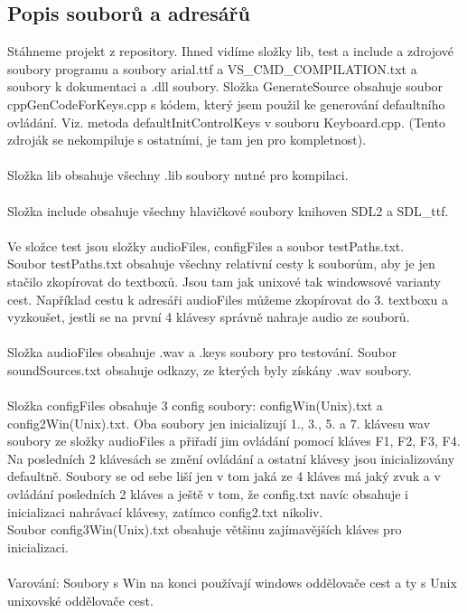\documentclass[12pt]{article}
\begin{document}
	\subsection{Popis souborů a adresářů}
	Stáhneme projekt z repository. Ihned vidíme složky lib, test a include a zdrojové soubory programu a soubory arial.ttf a VS\_CMD\_COMPILATION.txt a soubory k dokumentaci a .dll soubory. Složka GenerateSource obsahuje soubor cppGenCodeForKeys.cpp s kódem, který jsem použil ke generování defaultního ovládání. Viz. metoda defaultInitControlKeys v souboru Keyboard.cpp. (Tento zdroják se nekompiluje s ostatními, je tam jen pro kompletnost).
	\\
	\\
	Složka lib obsahuje všechny .lib soubory nutné pro kompilaci.
	\\
	\\
	Složka include obsahuje všechny hlavičkové soubory knihoven SDL2 a SDL\_ttf.
	\\
	\\
	Ve složce test jsou složky audioFiles, configFiles a soubor testPaths.txt.
	\\
	Soubor testPaths.txt obsahuje všechny relativní cesty k souborům, aby je jen stačilo zkopírovat do textboxů. Jsou tam jak unixové tak windowsové varianty cest. Například cestu k adresáři audioFiles můžeme zkopírovat do 3. textboxu a vyzkoušet, jestli se na první 4 klávesy správně nahraje audio ze souborů.
	\\
	\\
	Složka audioFiles obsahuje .wav a .keys soubory pro testování. Soubor soundSources.txt obsahuje odkazy, ze kterých byly získány .wav soubory.
	\\
	\\
	Složka configFiles obsahuje 3 config soubory: configWin(Unix).txt a config2Win(Unix).txt. Oba soubory jen inicializují 1., 3., 5. a 7. klávesu wav soubory ze složky audioFiles a přiřadí jim ovládání pomocí kláves F1, F2, F3, F4. Na posledních 2 klávesách se změní ovládání a ostatní klávesy jsou inicializovány defaultně. Soubory se od sebe liší jen v tom jaká ze 4 kláves má jaký zvuk a v ovládání posledních 2 kláves a ještě v tom, že config.txt navíc obsahuje i inicializaci nahrávací klávesy, zatímco config2.txt nikoliv.
	\\
	Soubor config3Win(Unix).txt obsahuje většinu zajímavějších kláves pro inicializaci.
	\\
	\\
	Varování: Soubory s Win na konci používají windows oddělovače cest a ty s Unix unixovské oddělovače cest.
	
\end{document}

